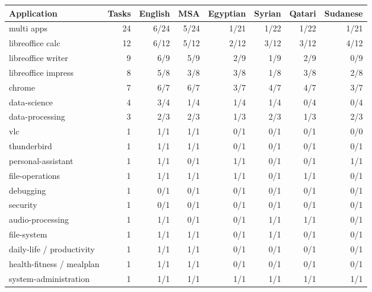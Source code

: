 \begin{tabular}{lrrrrrrr}
\toprule
Application & Tasks & English & MSA & Egyptian & Syrian & Qatari & Sudanese \\
\midrule
multi apps & 24 & 6/24 & 5/24 & 1/21 & 1/22 & 1/22 & 1/21 \\
libreoffice calc & 12 & 6/12 & 5/12 & 2/12 & 3/12 & 3/12 & 4/12 \\
libreoffice writer & 9 & 6/9 & 5/9 & 2/9 & 1/9 & 2/9 & 0/9 \\
libreoffice impress & 8 & 5/8 & 3/8 & 3/8 & 1/8 & 3/8 & 2/8 \\
chrome & 7 & 6/7 & 6/7 & 3/7 & 4/7 & 4/7 & 3/7 \\
data-science & 4 & 3/4 & 1/4 & 1/4 & 1/4 & 0/4 & 0/4 \\
data-processing & 3 & 2/3 & 2/3 & 1/3 & 2/3 & 1/3 & 2/3 \\
vlc & 1 & 1/1 & 1/1 & 0/1 & 0/1 & 0/1 & 0/0 \\
thunderbird & 1 & 1/1 & 1/1 & 0/1 & 0/1 & 0/1 & 0/1 \\
personal-assistant & 1 & 1/1 & 0/1 & 1/1 & 0/1 & 0/1 & 1/1 \\
file-operations & 1 & 1/1 & 1/1 & 1/1 & 0/1 & 1/1 & 0/1 \\
debugging & 1 & 0/1 & 0/1 & 0/1 & 0/1 & 0/1 & 0/1 \\
security & 1 & 0/1 & 0/1 & 0/1 & 0/1 & 0/1 & 0/1 \\
audio-processing & 1 & 1/1 & 0/1 & 0/1 & 1/1 & 1/1 & 0/1 \\
file-system & 1 & 1/1 & 1/1 & 0/1 & 1/1 & 0/1 & 0/1 \\
daily-life / productivity & 1 & 1/1 & 1/1 & 0/1 & 0/1 & 0/1 & 0/1 \\
health-fitness / mealplan & 1 & 1/1 & 1/1 & 0/1 & 0/1 & 0/1 & 0/1 \\
system-administration & 1 & 1/1 & 1/1 & 1/1 & 1/1 & 1/1 & 1/1 \\
\bottomrule
\end{tabular}
